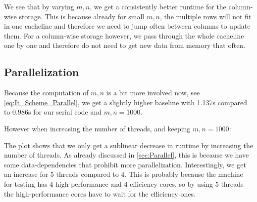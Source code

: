 \documentclass[a4paper]{scrartcl}
\begin{document}
        We see that by varying $m,n$, we get a consistently better runtime for
        the column-wise storage. This is because already for small $m,n$, the
        multiple rows will not fit in one cacheline and therefore we need to
        jump often between columns to update them. For a column-wise storage
        however, we pass through the whole cacheline one by one and therefore
        do not need to get new data from memory that often.

    \subsection{Parallelization}
        Because the computation of $m,n$ is a bit more involved now, see
        \ref{eq:It_Scheme_Parallel}, we get a slightly higher baseline with
        1.137s compared to 0.986s for our serial code and $m,n=1000$.
        
        However when increasing the number of threads, and keeping $m,n=1000$:\\

        The plot shows that we only get a sublinear decrease in runtime by
        increasing the number of threads. As already discussed in
        \ref{sec:Parallel}, this is because we have some data-dependencies that
        prohibit more parallelization. Interestingly, we get an increase for 5
        threads compared to 4. This is probably because the machine for testing
        has 4 high-performance and 4 efficiency cores, so by using 5 threads the
        high-performance cores have to wait for the efficiency ones.
\end{document}
